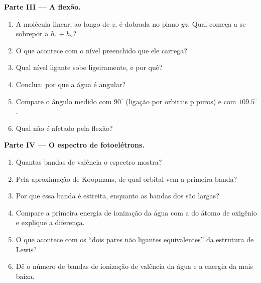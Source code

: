 \begin{problem}
\medskip
\noindent\textbf{Parte III --- A flexão.}
\begin{enumerate}[resume]
  \item A molécula linear, ao longo de $z$, é dobrada no plano $yz$. Qual
         começa a se sobrepor a $h_1 + h_2$?
  \item O que acontece com o nível preenchido que ele carrega?
  \item Qual nível ligante sobe ligeiramente, e por quê?
  \item Conclua: por que a água é angular?
  \item Compare o ângulo medido com $90^\circ$ (ligação por orbitais p puros) e com $109.5^\circ$.
  \item Qual  não é afetado pela flexão?
\end{enumerate}

\medskip
\noindent\textbf{Parte IV --- O espectro de fotoelétrons.}
\begin{enumerate}[resume]
  \item Quantas bandas de valência o espectro mostra?
  \item Pela aproximação de Koopmans, de qual orbital vem a primeira banda?
  \item Por que essa banda é estreita, enquanto as bandas dos  são largas?
  \item Compare a primeira energia de ionização da água com a do átomo de
        oxigênio e explique a diferença.
  \item O que acontece com os ``dois pares não ligantes equivalentes'' da estrutura de Lewis?
  \item Dê o número de bandas de ionização de valência da água e a energia da
        mais baixa.
\end{enumerate}
\end{problem}
